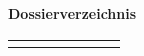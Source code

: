 {\bf Dossierverzeichnis}\\
\vspace{\baselineskip}
\scriptsize
\noindent

\setlength\extrarowheight{1pt}
\begin{supertabular*}{\textwidth}{p{4mm}p{20mm}p{20mm}p{35mm}p{35mm}p{10mm}p{10mm}}


\shrinkheight{60mm}

\end{supertabular*}
